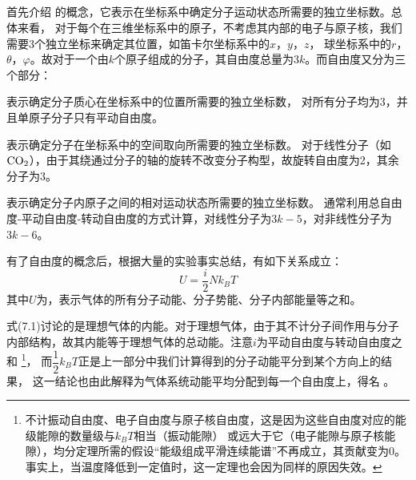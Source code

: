         \subsection[能量均分原理]{}
            首先介绍 的概念，它表示在坐标系中确定分子运动状态所需要的独立坐标数。总体来看，
            对于每个在三维坐标系中的原子，不考虑其内部的电子与原子核，我们需要3个独立坐标来确定其位置，如笛卡尔坐标系中的$x$，$y$，$z$，
            球坐标系中的$r$，$\theta$，$\varphi$。故对于一个由$k$个原子组成的分子，其自由度总量为$3k$。而自由度又分为三个部分：
            \begin{Itemize}
                \item {} 表示确定分子质心在坐标系中的位置所需要的独立坐标数，
                对所有分子均为3，并且单原子分子只有平动自由度。
                \item {} 表示确定分子在坐标系中的空间取向所需要的独立坐标数。
                对于线性分子（如$\rm{CO_{2}}$），由于其绕通过分子的轴的旋转不改变分子构型，故旋转自由度为2，其余分子为3。
                \item {} 表示确定分子内原子之间的相对运动状态所需要的独立坐标数。
                通常利用总自由度-平动自由度-转动自由度的方式计算，对线性分子为$3k-5$，对非线性分子为$3k-6$。
            \end{Itemize}

            有了自由度的概念后，根据大量的实验事实总结，有如下关系成立：
            \begin{equation}
                U = \frac{i}{2}Nk_{B}T
            \end{equation}
            其中$U$为，表示气体的所有分子动能、分子势能、分子内部能量等之和。
            
            式(7.1)讨论的是理想气体的内能。对于理想气体，由于其不计分子间作用与分子内部结构，故其内能等于理想气体的总动能。注意$i$为平动自由度与转动自由度之和
            \footnote{不计振动自由度、电子自由度与原子核自由度，这是因为这些自由度对应的能级能隙的数量级与$k_{B}T$相当（振动能隙）
            或远大于它（电子能隙与原子核能隙），均分定理所需的假设“能级组成平滑连续能谱”不再成立，其贡献变为$0$。
            事实上，当温度降低到一定值时，这一定理也会因为同样的原因失效。}，
            而$\dfrac{1}{2}k_{B}T$正是上一部分中我们计算得到的分子动能平分到某个方向上的结果，
            这一结论也由此解释为气体系统动能平均分配到每一个自由度上，得名 。
